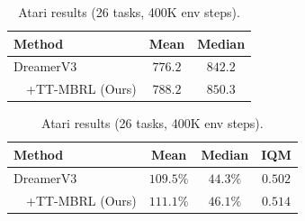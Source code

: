 \begin{table}[h]
\centering
\begin{minipage}{0.49\textwidth}
    \centering
    \caption{DMC results (20 tasks, 1M env steps).}
    \begin{tabular}{lcc}
    \toprule
    \textbf{Method} & \textbf{Mean} & \textbf{Median} \\ 
    \midrule
    DreamerV3 & $776.2$ & $842.2$ \\ 
    ~~+TT-MBRL (Ours) & $\mathbf{788.2}$ & $\mathbf{850.3}$ \\
    \bottomrule
    \end{tabular}
\label{table:results_dmc}
\end{minipage}
\hfill
\begin{minipage}{0.49\textwidth}
    \centering
    \caption{Atari results (26 tasks, 400K env steps).}
    \setlength{\tabcolsep}{2.5pt}
    \begin{tabular}{lccc}
    \toprule
    \textbf{Method} & \textbf{Mean} & \textbf{Median} & \textbf{IQM} \\ 
    \midrule
    DreamerV3 & $109.5\%$ & $44.3\%$ & $0.502$ \\ 
    ~~+TT-MBRL (Ours) & $\mathbf{111.1\%}$ & $\mathbf{46.1\%}$ & $\mathbf{0.514}$ \\
    \bottomrule
    \end{tabular}
\label{table:results_atari}
\end{minipage}
\end{table}